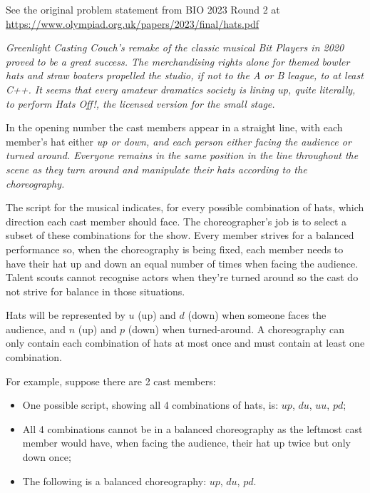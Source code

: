 \begin{center}\small{
  See the original problem statement from BIO 2023 Round 2 at
  \url{https://www.olympiad.org.uk/papers/2023/final/hats.pdf}
}\end{center}

\it{Greenlight Casting Couch's} remake of the classic musical \it{Bit Players} in 2020 proved to be a great success. The merchandising rights alone for themed bowler hats and straw boaters propelled the studio, if not to the A or B league, to at least C++. It seems that every amateur dramatics society is lining up, quite literally, to perform \it{Hats Off!}, the licensed version for the small stage.

In the opening number the cast members appear in a straight line, with each member's hat either \it{up} or \it{down}, and each person either facing the audience or turned around. Everyone remains in the same position in the line throughout the scene as they turn around and manipulate their hats according to the choreography.

The script for the musical indicates, for every possible combination of hats, which direction each cast member should face. The choreographer's job is to select a subset of these combinations for the show. Every member strives for a balanced performance so, when the choreography is being fixed, each member needs to have their hat up and down an equal number of times when facing the audience. Talent scouts cannot recognise actors when they're turned around so the cast do not strive for balance in those situations.

Hats will be represented by $u$ (up) and $d$ (down) when someone faces the audience, and $n$ (up) and $p$ (down) when turned-around. A choreography can only contain each combination of hats at most once and must contain at least one combination.

For example, suppose there are 2 cast members:
\begin{itemize}
  \item One possible script, showing all 4 combinations of hats, is: $up$, $du$, $uu$, $pd$;
  \item All 4 combinations cannot be in a balanced choreography as the leftmost cast member would have, when facing the audience, their hat up twice but only down once;
  \item The following is a balanced choreography: $up$, $du$, $pd$.
\end{itemize}
